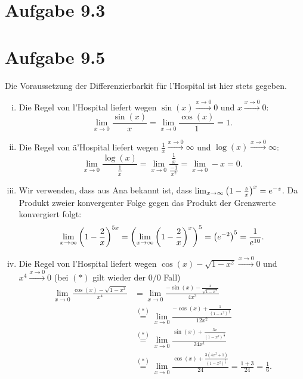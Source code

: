 \documentclass{theozettel}
\begin{document}

\section*{Aufgabe 9.3}



\section*{Aufgabe 9.5} 
Die Voraussetzung der Differenzierbarkit für l'Hospital ist hier stets gegeben.
\begin{enumerate}[(i)]
	\item 	Die Regel von l'Hospital liefert wegen $\sin(x) \stackrel{x \to 0}{\longrightarrow} 0$ und $x \stackrel{x \to 0}{\longrightarrow} 0$:
			\[
				\lim_{x \to 0} \frac{\sin(x)}{x} = \lim_{x \to 0} \frac{\cos(x)}{1} = 1.
			\]
			
	\item 	Die Regel von ä'Hospital liefert wegen $\frac{1}{x} \stackrel{x \to 0}{\longrightarrow} \infty$ und $\log(x) \stackrel{x \to 0}{\longrightarrow} \infty$:
			\[
				\lim_{x \to 0} \frac{\log(x)}{\frac{1}{x}} = \lim_{x \to 0} \frac{\frac{1}{x} }{ \frac{-1}{x^{2}}} = \lim_{x \to 0} -x = 0.
			\]
	
	\item 	Wir verwenden, dass aus Ana bekannt ist, dass $\lim_{x \to \infty} \qty(1 - \frac{z}{x})^{x} = e^{-z}$. Da Produkt zweier konvergenter Folge gegen das Produkt der Grenzwerte konvergiert folgt:
			\[
				\lim_{x \to \infty} \qty(1-\frac{2}{x})^{5x} = \left( \lim_{x \to \infty} \qty(1-\frac{2}{x})^{x} \right)^{5} = \qty(e^{-2})^{5} =\frac{1}{e^{10}}.
			\]
	
	\item 	Die Regel von l'Hospital liefert wegen $\cos(x) - \sqrt{1-x^{2}} \stackrel{x \to 0}{\longrightarrow} 0$ und $x^{4} \stackrel{x \to 0}{\longrightarrow} 0$ (bei $(*)$ gilt wieder der $0/0$ Fall)
			\begin{align*}
				\lim_{x \to 0} \frac{\cos(x) - \sqrt{1-x^{2}}}{x^{4}} &= \lim_{x \to 0} \frac{-\sin(x) - \frac{x}{\sqrt{1-x^{2}}}}{4x^{3}} \\
				&\stackrel{(*)}{=} \lim_{x \to 0} \frac{-\cos(x) + \frac{1}{(1-x^{2})^{\frac{3}{2}}}}{12x^{2}}  \\
				&\stackrel{(*)}{=} \lim_{x \to 0} \frac{\sin(x) + \frac{3x}{(1-x^{2})^{\frac{5}{2}}}}{24x^{1}} \\
				&\stackrel{(*)}{=} \lim_{x \to 0} \frac{\cos(x) + \frac{3(4x^2 + 1)}{(1-x^{2})^{\frac{7}{2}}}}{24} = \frac{1 + 3}{24} = \frac{1}{6}.			
			\end{align*}
	

\end{enumerate}
\end{document}
